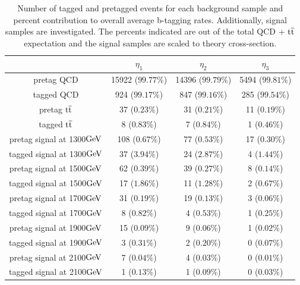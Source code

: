 \begin{table}
\begin{center}
\begin{tabular}{c||c|c|c} 
\hline\hline
  & $\eta_1$ & $\eta_2$ & $\eta_3$ \\
\hline\hline
pretag QCD & 15922 ($99.77\%$) & 14396 ($99.79\%$) & 5494 ($99.81\%$)\\
tagged QCD & 924 ($99.17\%$) & 847 ($99.16\%$) & 285 ($99.54\%$)\\
pretag $\mathrm{t\overline{t}}$ & 37 ($0.23\%$) & 31 ($0.21\%$) & 11 ($0.19\%$)\\
tagged $\mathrm{t\overline{t}}$ & 8 ($0.83\%$) & 7 ($0.84\%$) & 1 ($0.46\%$)\\
pretag signal at 1300$\mathrm{GeV}$ & 108 ($0.67\%$) & 77 ($0.53\%$) & 17 ($0.30\%$)\\
tagged signal at 1300$\mathrm{GeV}$ & 37 ($3.94\%$) & 24 ($2.87\%$) & 4 ($1.44\%$)\\
pretag signal at 1500$\mathrm{GeV}$ & 62 ($0.39\%$) & 39 ($0.27\%$) & 8 ($0.14\%$)\\
tagged signal at 1500$\mathrm{GeV}$ & 17 ($1.86\%$) & 11 ($1.28\%$) & 2 ($0.67\%$)\\
pretag signal at 1700$\mathrm{GeV}$ & 31 ($0.19\%$) & 19 ($0.13\%$) & 3 ($0.06\%$)\\
tagged signal at 1700$\mathrm{GeV}$ & 8 ($0.82\%$) & 4 ($0.53\%$) & 1 ($0.25\%$)\\
pretag signal at 1900$\mathrm{GeV}$ & 15 ($0.09\%$) & 9 ($0.06\%$) & 1 ($0.02\%$)\\
tagged signal at 1900$\mathrm{GeV}$ & 3 ($0.31\%$) & 2 ($0.20\%$) & 0 ($0.07\%$)\\
pretag signal at 2100$\mathrm{GeV}$ & 7 ($0.04\%$) & 4 ($0.03\%$) & 0 ($0.01\%$)\\
tagged signal at 2100$\mathrm{GeV}$ & 1 ($0.13\%$) & 1 ($0.09\%$) & 0 ($0.03\%$)\\
\hline
\end{tabular}
\end{center}
\caption{Number of tagged and pretagged events for each background sample and percent contribution to overall average b-tagging rates.  Additionally, signal samples are investigated.  
The percents indicated are out of the total QCD + $\mathrm{t\overline{t}}$ expectation and the signal samples are scaled to theory cross-section.}
\label{table:singletop}
\end{table}

